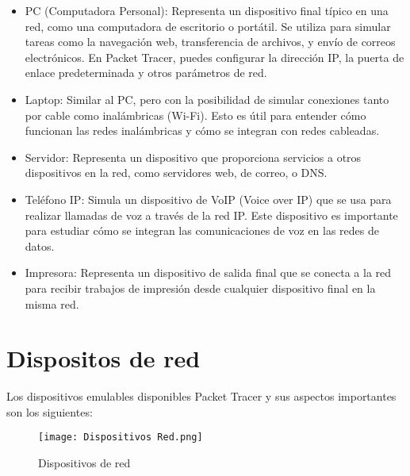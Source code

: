\documentclass[12pt, a4paper]{article}
\begin{document}
\begin{itemize}
    \item PC (Computadora Personal): Representa un dispositivo final típico en una red, como una computadora de escritorio o portátil. Se utiliza para simular tareas como la navegación web, transferencia de archivos, y envío de correos electrónicos. En Packet Tracer, puedes configurar la dirección IP, la puerta de enlace predeterminada y otros parámetros de red.
    \item Laptop: Similar al PC, pero con la posibilidad de simular conexiones tanto por cable como inalámbricas (Wi-Fi). Esto es útil para entender cómo funcionan las redes inalámbricas y cómo se integran con redes cableadas.
    \item Servidor: Representa un dispositivo que proporciona servicios a otros dispositivos en la red, como servidores web, de correo, o DNS.
    \item Teléfono IP: Simula un dispositivo de VoIP (Voice over IP) que se usa para realizar llamadas de voz a través de la red IP. Este dispositivo es importante para estudiar cómo se integran las comunicaciones de voz en las redes de datos.
    \item Impresora: Representa un dispositivo de salida final que se conecta a la red para recibir trabajos de impresión desde cualquier dispositivo final en la misma red.
\end{itemize}

\section{Dispositos de red}
Los dispositivos emulables disponibles Packet Tracer y sus aspectos importantes son los siguientes:

\begin{figure}[H]
    \centering
    \texttt{[image: Dispositivos Red.png]}
    \caption{Dispositivos de red}
    \label{fig:enter-label}
\end{figure}
\end{document}
